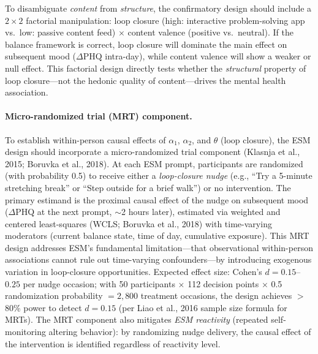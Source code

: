 \documentclass[a4paper,11pt,titlepage]{article}
\begin{document}
To disambiguate \emph{content} from \emph{structure}, the confirmatory design should include a $2 \times 2$ factorial manipulation: loop closure (high: interactive problem-solving app vs.\ low: passive content feed) $\times$ content valence (positive vs.\ neutral). If the balance framework is correct, loop closure will dominate the main effect on subsequent mood ($\Delta$PHQ intra-day), while content valence will show a weaker or null effect. This factorial design directly tests whether the \emph{structural} property of loop closure---not the hedonic quality of content---drives the mental health association.

\paragraph{Micro-randomized trial (MRT) component.}
To establish within-person causal effects of $\alpha_1$, $\alpha_2$, and $\theta$ (loop closure), the ESM design should incorporate a micro-randomized trial component (Klasnja et al., 2015; Boruvka et al., 2018). At each ESM prompt, participants are randomized (with probability 0.5) to receive either a \textit{loop-closure nudge} (e.g., ``Try a 5-minute stretching break'' or ``Step outside for a brief walk'') or no intervention. The primary estimand is the proximal causal effect of the nudge on subsequent mood ($\Delta$PHQ at the next prompt, $\sim$2 hours later), estimated via weighted and centered least-squares (WCLS; Boruvka et al., 2018) with time-varying moderators (current balance state, time of day, cumulative exposure). This MRT design addresses ESM's fundamental limitation---that observational within-person associations cannot rule out time-varying confounders---by introducing exogenous variation in loop-closure opportunities. Expected effect size: Cohen's $d = 0.15$--$0.25$ per nudge occasion; with 50 participants $\times$ 112 decision points $\times$ 0.5 randomization probability $= 2{,}800$ treatment occasions, the design achieves $>$80\% power to detect $d = 0.15$ (per Liao et al., 2016 sample size formula for MRTs). The MRT component also mitigates \textit{ESM reactivity} (repeated self-monitoring altering behavior): by randomizing nudge delivery, the causal effect of the intervention is identified regardless of reactivity level.
\end{document}
